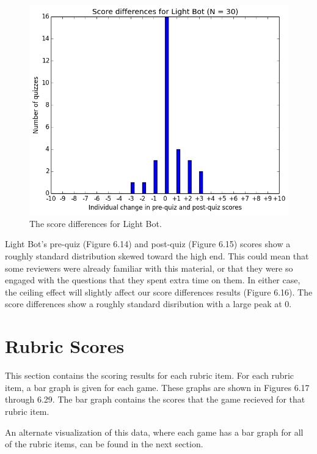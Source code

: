 			\begin{figure}[] 
			\centering 
			\includegraphics[width=\textwidth]{lightbot_results.png} 
			\caption{The score differences for Light Bot.}
			\end{figure}

			Light Bot's pre-quiz (Figure 6.14) and post-quiz (Figure 6.15) scores show a roughly standard distribution skewed toward the high end. This could mean that some reviewers were already familiar with this material, or that they were so engaged with the questions that they spent extra time on them. In either case, the ceiling effect will slightly affect our score differences results (Figure 6.16). The score differences show a roughly standard disribution with a large peak at 0.

			\clearpage

		\section{Rubric Scores}
			This section contains the scoring results for each rubric item. For each rubric item, a bar graph is given for each game. These graphs are shown in Figures 6.17 through 6.29. The bar graph contains the scores that the game recieved for that rubric item.

			An alternate visualization of this data, where each game has a bar graph for all of the rubric items, can be found in the next section.


